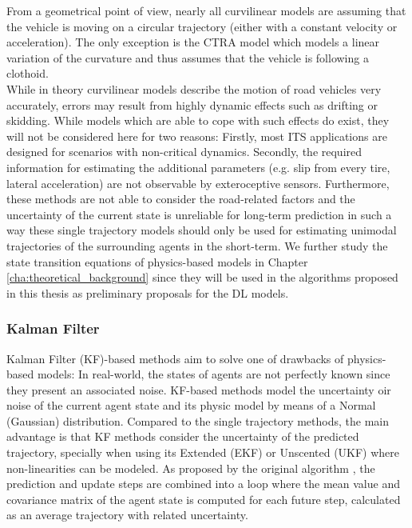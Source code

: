 From a geometrical point of view, nearly all curvilinear models are assuming that the vehicle is moving on a circular trajectory (either with a constant velocity or acceleration). The only exception is the CTRA model which models a linear variation of the curvature and thus assumes that the vehicle is following a clothoid. \\

While in theory curvilinear models describe the motion of road vehicles very accurately, errors may result from highly dynamic effects such as drifting or skidding. While models which are able to cope with such effects do exist, they will not be considered here for two reasons: Firstly, most \ac{ITS} applications are designed for scenarios with non-critical dynamics. Secondly, the required information for estimating the additional parameters (e.g. slip from every tire, lateral acceleration) are not observable by exteroceptive sensors. Furthermore, these methods are not able to consider the road-related factors and the uncertainty of the current state is unreliable for long-term prediction in such a way these single trajectory models should only be used for estimating unimodal trajectories of the surrounding agents in the short-term. We further study the state transition equations of physics-based models in Chapter \ref{cha:theoretical_background} since they will be used in the algorithms proposed in this thesis as preliminary proposals for the \ac{DL} models.

\subsubsection{Kalman Filter}
\label{subsubsec:2_kalman_filter_mp}

Kalman Filter (KF)-based methods aim to solve one of drawbacks of physics-based models: In real-world, the states of agents are not perfectly known since they present an associated noise. KF-based methods model the uncertainty oir noise of the current agent state and its physic model by means of a Normal (Gaussian) distribution. Compared to the single trajectory methods, the main advantage is that KF methods consider the uncertainty of the predicted trajectory, specially when using its Extended (EKF) or Unscented (UKF) where non-linearities can be modeled. As proposed by the original algorithm \cite{kalman1960new}, the prediction and update steps are combined into a loop where the mean value and covariance matrix of the agent state is computed for each future step, calculated as an average trajectory with related uncertainty. \\

